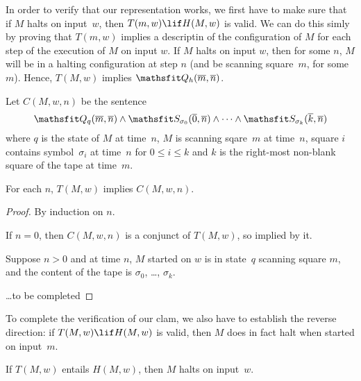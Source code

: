 \documentclass[../../include/open-logic-section]{subfiles}
\begin{document}

\begin{explain}
In order to verify that our representation works, we first have to
make sure that if $M$ halts on input~$w$, then $T(m, w) \lif H(M, w)$
is valid.  We can do this simly by proving that $T(m, w)$ implies a
descriptin of the configuration of $M$ for each step of the execution
of $M$ on input $w$.  If $M$ halts on input $w$, then for some $n$,
$M$ will be in a halting configuration at step $n$ (and be scanning
square~$m$, for some $m$).  Hence, $T(M, w)$ implies $\Obj
Q_h(\overline m, \overline n)$.  
\end{explain}

\begin{defn}
Let $C(M, w, n)$ be the sentence
\[
\Obj Q_q(\overline m, \overline n) \land \Obj S_{\sigma_0}(\overline
0, \overline n) \land \dots \land \Obj S_{\sigma_k}(\overline k,
\overline n)
\]
where $q$ is the state of $M$ at time~$n$, $M$ is scanning sqare~$m$
at time~$n$, square $i$ contains symbol~$\sigma_i$ at time~$n$ for $0
\le i \le k$ and $k$ is the right-most non-blank square of the tape at
time~$m$.
\end{defn}

\begin{lem}
For each $n$, $T(M, w)$ implies $C(M, w, n)$.
\end{lem}

\begin{proof}
By induction on $n$.

If $n = 0$, then $C(M, w, n)$ is a conjunct of $T(M, w)$, so implied by it.

Suppose $n > 0$ and at time $n$, $M$ started on $w$ is in state~$q$
scanning square $m$, and the content of the tape is $\sigma_0$, \dots,
$\sigma_k$.

\dots to be completed


\end{proof}

\begin{explain}
To complete the verification of our clam, we also have to establish
the reverse direction: if $T(M, w) \lif H(M, w)$ is valid, then $M$
does in fact halt when started on input~$m$.  
\end{explain}

\begin{lem}
If $T(M, w)$ entails $H(M, w)$, then $M$ halts on input~$w$.
\end{lem}
\end{document}
